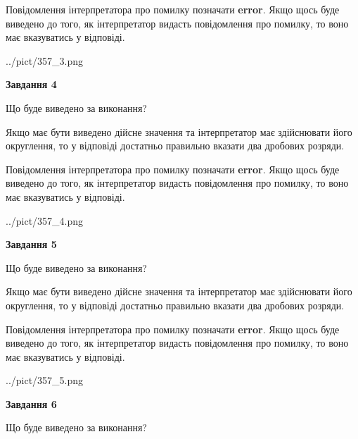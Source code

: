 \documentclass[12pt, ukrainian]{article}
\begin{document}
{\begin {Large}
Повідомлення інтерпретатора про помилку позначати \textbf{error}.
Якщо щось буде виведено до того, як інтерпретатор видасть повідомлення про помилку, 
то воно має вказуватись у відповіді. \par

\begin{center}
	{../pict/357_3.png}
\end{center}
\newpage

{\begin {center}\textbf{Завдання 4}\end {center}}\par
Що буде виведено за виконання? \par

Якщо має бути виведено дійсне значення та інтерпретатор має здійснювати його округлення, 
то у відповіді достатньо правильно вказати два дробових розряди.

Повідомлення інтерпретатора про помилку позначати \textbf{error}.
Якщо щось буде виведено до того, як інтерпретатор видасть повідомлення про помилку, 
то воно має вказуватись у відповіді. \par

\begin{center}
	{../pict/357_4.png}
\end{center}
\newpage

{\begin {center}\textbf{Завдання 5}\end {center}}\par
Що буде виведено за виконання? \par

Якщо має бути виведено дійсне значення та інтерпретатор має здійснювати його округлення, 
то у відповіді достатньо правильно вказати два дробових розряди.

Повідомлення інтерпретатора про помилку позначати \textbf{error}.
Якщо щось буде виведено до того, як інтерпретатор видасть повідомлення про помилку, 
то воно має вказуватись у відповіді. \par

\begin{center}
	{../pict/357_5.png}
\end{center}
\newpage

{\begin {center}\textbf{Завдання 6}\end {center}}\par
Що буде виведено за виконання? \par


\end{Large}}
\end{document}

